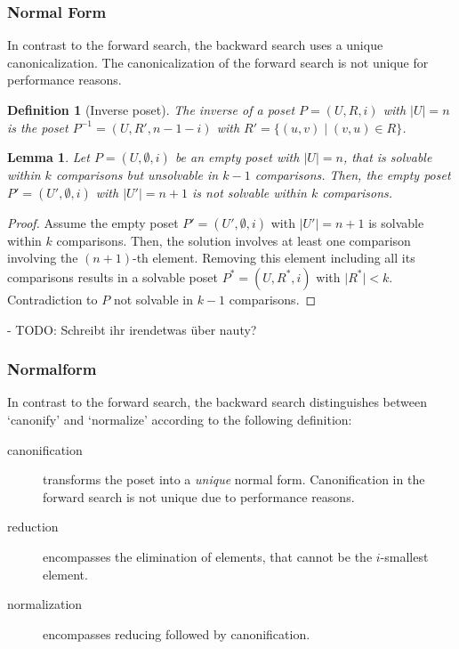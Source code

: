 \documentclass[10pt,journal,compsoc]{IEEEtran}
\newtheorem{lemma}{Lemma}
\newtheorem{definition}{Definition}
\begin{document}

\subsubsection{Normal Form} \label{sec:backward:normal_form}

In contrast to the forward search, the backward search uses a unique canonicalization.
The canonicalization of the forward search is not unique for performance reasons.

\begin{definition}[Inverse poset] \label{definition:inverse_poset}
  The inverse of a poset $P=(U, R, i)$ with $\vert U \vert=n$ is the poset $P^{-1}=(U,R',n-1-i)$ with $R' = \{(u,v) \; \vert \; (v,u) \in R\}$.
\end{definition}

\begin{lemma} \label{lemma:inverse_poset}
  Let $P=(U,\emptyset,i)$ be an empty poset with $\vert U \vert = n$, that is solvable within $k$ comparisons but unsolvable in $k-1$ comparisons.
  Then, the empty poset $P'=(U',\emptyset,i)$ with $\vert U'\vert = n+1$ is not solvable within $k$ comparisons.
\end{lemma}

\begin{proof} \label{proof:inverse_poset}
  Assume the empty poset $P'=(U',\emptyset,i)$ with $\vert U' \vert = n+1$ is solvable within $k$ comparisons. Then, the solution involves at least one comparison involving the $(n+1)$-th element. Removing this element including all its comparisons results in a solvable poset $P^{*}=(U,R^{*},i)$ with $\vert R^{*}\vert < k$. Contradiction to $P$ not solvable in $k-1$ comparisons.
\end{proof}
- TODO: Schreibt ihr irendetwas über nauty?

\subsubsection{Normalform}
In contrast to the forward search, the backward search distinguishes between `canonify' and `normalize' according to the following definition:
\begin{description}
  \item[canonification] \hfill

        transforms the poset into a \textit{unique} normal form.
        Canonification in the forward search is not unique due to performance reasons.
  \item[reduction] \hfill

        encompasses the elimination of elements, that cannot be the $i$-smallest element.
  \item[normalization] \hfill

        encompasses reducing followed by canonification.
\end{description}
\end{document}
